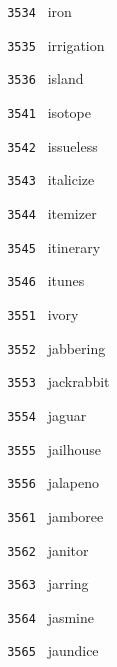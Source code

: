 \documentclass[11pt]{article}
\begin{document}
\begin{multicols}{6}
\noindent \texttt{ 3534 } \hspace{1mm} iron  \par
\noindent \texttt{ 3535 } \hspace{1mm} irrigation  \par
\noindent \texttt{ 3536 } \hspace{1mm} island  \par
\noindent \texttt{ 3541 } \hspace{1mm} isotope  \par
\noindent \texttt{ 3542 } \hspace{1mm} issueless  \par
\noindent \texttt{ 3543 } \hspace{1mm} italicize  \par
\noindent \texttt{ 3544 } \hspace{1mm} itemizer  \par
\noindent \texttt{ 3545 } \hspace{1mm} itinerary  \par
\noindent \texttt{ 3546 } \hspace{1mm} itunes  \par
\noindent \texttt{ 3551 } \hspace{1mm} ivory  \par
\noindent \texttt{ 3552 } \hspace{1mm} jabbering  \par
\noindent \texttt{ 3553 } \hspace{1mm} jackrabbit  \par
\noindent \texttt{ 3554 } \hspace{1mm} jaguar  \par
\noindent \texttt{ 3555 } \hspace{1mm} jailhouse  \par
\noindent \texttt{ 3556 } \hspace{1mm} jalapeno  \par
\noindent \texttt{ 3561 } \hspace{1mm} jamboree  \par
\noindent \texttt{ 3562 } \hspace{1mm} janitor  \par
\noindent \texttt{ 3563 } \hspace{1mm} jarring  \par
\noindent \texttt{ 3564 } \hspace{1mm} jasmine  \par
\noindent \texttt{ 3565 } \hspace{1mm} jaundice  \par

\end{multicols}
\end{document}
